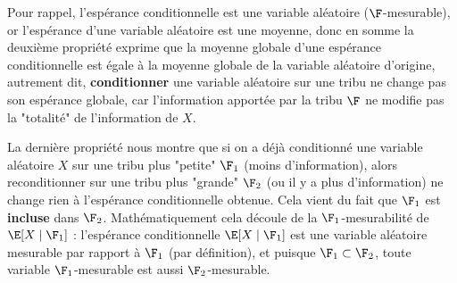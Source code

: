     \en
    \item Pour rappel, l'espérance conditionnelle est une variable aléatoire ($\F$-mesurable), or l'espérance d'une variable aléatoire est une moyenne, donc en somme la deuxième propriété exprime que la moyenne globale d'une espérance conditionnelle est égale à la moyenne globale de la variable aléatoire d'origine, autrement dit, \textbf{conditionner} une variable aléatoire sur une tribu ne change pas son espérance globale, car l'information apportée par la tribu $\F$ ne modifie pas la "totalité" de l'information de $X$.
    \item La dernière propriété nous montre que si on a déjà conditionné une variable aléatoire $X$ sur une tribu plus "petite" $\F_1$ (\ie moins d'information), alors reconditionner sur une tribu plus "grande" $\F_2$ (\ie ou il y a plus d'information) ne change rien à l'espérance conditionnelle obtenue. Cela vient du fait que $\F_1$ est \textbf{incluse} dans $\F_2$. Mathématiquement cela découle de la $\F_1$-mesurabilité de $\E[X \mid \F_1]$ : l'espérance conditionnelle $\E[X \mid \F_1]$ est une variable aléatoire mesurable par rapport à $\F_1$ (par définition), et puisque $\F_1 \subset \F_2$, toute variable $\F_1$-mesurable est aussi $\F_2$-mesurable.
\een
\epf
    
    
    
    
    
    
    
    
    
    
    

